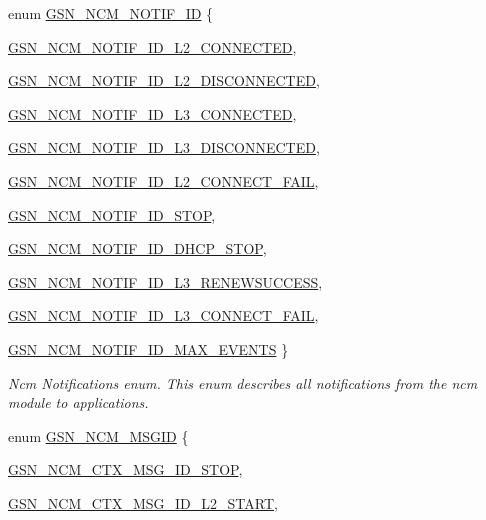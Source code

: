 \begin{DoxyCompactItemize}
enum \hyperlink{a00688_ga9e3bfe0ed58e26633d51d10250743b2a}{GSN\_\-NCM\_\-NOTIF\_\-ID} \{ \par
\hyperlink{a00688_gga9e3bfe0ed58e26633d51d10250743b2aaa469a6d8952fabb7ed031d3632b0ce2a}{GSN\_\-NCM\_\-NOTIF\_\-ID\_\-L2\_\-CONNECTED}, 
\par
\hyperlink{a00688_gga9e3bfe0ed58e26633d51d10250743b2aab61142f531039c917939e563b9c35948}{GSN\_\-NCM\_\-NOTIF\_\-ID\_\-L2\_\-DISCONNECTED}, 
\par
\hyperlink{a00688_gga9e3bfe0ed58e26633d51d10250743b2aa5bce6739a2807e89ec851b581e6950ac}{GSN\_\-NCM\_\-NOTIF\_\-ID\_\-L3\_\-CONNECTED}, 
\par
\hyperlink{a00688_gga9e3bfe0ed58e26633d51d10250743b2aa106659fe26e5c7b32dc6c053c24119e5}{GSN\_\-NCM\_\-NOTIF\_\-ID\_\-L3\_\-DISCONNECTED}, 
\par
\hyperlink{a00688_gga9e3bfe0ed58e26633d51d10250743b2aa5c33280f1c2aebc7b446f0f2beb52a13}{GSN\_\-NCM\_\-NOTIF\_\-ID\_\-L2\_\-CONNECT\_\-FAIL}, 
\par
\hyperlink{a00688_gga9e3bfe0ed58e26633d51d10250743b2aa7e3668f406bf505ca49b4f08ff8c7b39}{GSN\_\-NCM\_\-NOTIF\_\-ID\_\-STOP}, 
\par
\hyperlink{a00688_gga9e3bfe0ed58e26633d51d10250743b2aac166aef75f66aecaf90efdc4d9cd1c3b}{GSN\_\-NCM\_\-NOTIF\_\-ID\_\-DHCP\_\-STOP}, 
\par
\hyperlink{a00688_gga9e3bfe0ed58e26633d51d10250743b2aa0da52269d834fdb60f3387386dbf68b2}{GSN\_\-NCM\_\-NOTIF\_\-ID\_\-L3\_\-RENEWSUCCESS}, 
\par
\hyperlink{a00688_gga9e3bfe0ed58e26633d51d10250743b2aabdf8839e06c133c9ac4b3596cd3f7fd7}{GSN\_\-NCM\_\-NOTIF\_\-ID\_\-L3\_\-CONNECT\_\-FAIL}, 
\par
\hyperlink{a00688_gga9e3bfe0ed58e26633d51d10250743b2aa49148962df3de573148d7f5f35e26364}{GSN\_\-NCM\_\-NOTIF\_\-ID\_\-MAX\_\-EVENTS}
 \}
\begin{DoxyCompactList}\small\item\em Ncm Notifications enum. This enum describes all notifications from the ncm module to applications. \end{DoxyCompactList}\item 
enum \hyperlink{a00688_ga7df8ae3172682e89bfa663208e3f0081}{GSN\_\-NCM\_\-MSGID} \{ \par
\hyperlink{a00688_gga7df8ae3172682e89bfa663208e3f0081ac1fa29f30c497cc6d0d63e369c4ebc96}{GSN\_\-NCM\_\-CTX\_\-MSG\_\-ID\_\-STOP}, 
\par
\hyperlink{a00688_gga7df8ae3172682e89bfa663208e3f0081a2f7930cb346bbde0451d5000058a7bbd}{GSN\_\-NCM\_\-CTX\_\-MSG\_\-ID\_\-L2\_\-START}, 

\end{DoxyCompactItemize}
